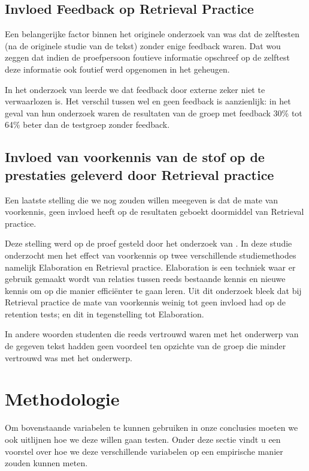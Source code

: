 \documentclass{hogent-article}
\begin{document}
\subsection{Invloed Feedback op Retrieval Practice}

Een belangerijke factor binnen het originele onderzoek van \textcite{Roediger_2006} was dat de zelftesten (na de originele studie van de tekst) zonder enige feedback waren. Dat wou zeggen dat indien de proefpersoon foutieve informatie opschreef op de zelftest deze informatie ook foutief werd opgenomen in het geheugen.\\
\par
\noindent
In het onderzoek van \textcite{Roediger_2011} leerde we dat feedback door externe zeker niet te verwaarlozen is. Het verschil tussen wel en geen feedback is aanzienlijk: in het geval van hun onderzoek waren de resultaten van de groep met feedback 30\% tot 64\% beter dan de testgroep zonder feedback.

\subsection{Invloed van voorkennis van de stof op de prestaties geleverd door Retrieval practice}

Een laatste stelling die we nog zouden willen meegeven is dat de mate van voorkennis, geen invloed heeft op de resultaten geboekt doormiddel van Retrieval practice.\\
\par
\noindent
Deze stelling werd op de proef gesteld door het onderzoek van \textcite{Xiaofeng_2016}. In deze studie onderzocht men het effect van voorkennis op twee verschillende studiemethodes namelijk Elaboration en Retrieval practice. Elaboration is een techniek waar er gebruik gemaakt wordt van relaties tussen reeds bestaande kennis en nieuwe kennis om op die manier efficiënter te gaan leren. Uit dit onderzoek bleek dat bij Retrieval practice de mate van voorkennis weinig tot geen invloed had op de retention tests; en dit in tegenstelling tot Elaboration.\\
\par
\noindent
In andere woorden studenten die reeds vertrouwd waren met het onderwerp van de gegeven tekst hadden geen voordeel ten opzichte van de groep die minder vertrouwd was met het onderwerp.

\section{Methodologie}
\label{methodologie}
Om bovenstaande variabelen te kunnen gebruiken in onze conclusies moeten we ook uitlijnen hoe we deze willen gaan testen. Onder deze sectie vindt u een voorstel over hoe we deze verschillende variabelen op een empirische manier zouden kunnen meten.
\end{document}
